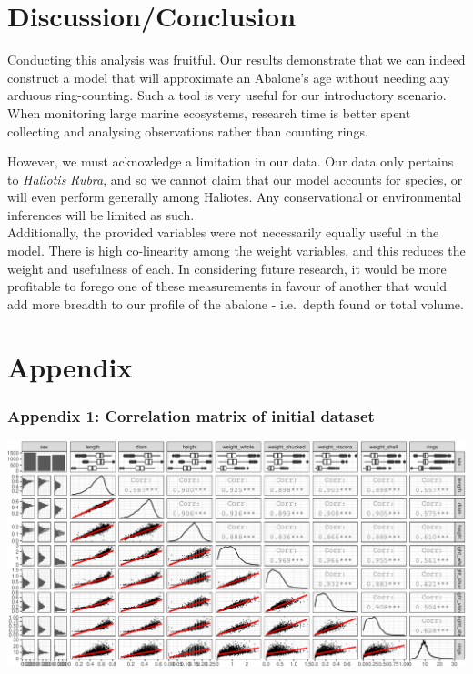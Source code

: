 \documentclass[letterpaper,9pt,twocolumn,twoside,]{pinp}
\begin{document}
\hypertarget{discussionconclusion}{%
\section{Discussion/Conclusion}\label{discussionconclusion}}

Conducting this analysis was fruitful. Our results demonstrate that we
can indeed construct a model that will approximate an Abalone's age
without needing any arduous ring-counting. Such a tool is very useful
for our introductory scenario. When monitoring large marine ecosystems,
research time is better spent collecting and analysing observations
rather than counting rings.

However, we must acknowledge a limitation in our data. Our data only
pertains to \emph{Haliotis} \emph{Rubra}, and so we cannot claim that
our model accounts for species, or will even perform generally among
Haliotes. Any conservational or environmental inferences will be limited
as such.\\
Additionally, the provided variables were not necessarily equally useful
in the model. There is high co-linearity among the weight variables, and
this reduces the weight and usefulness of each. In considering future
research, it would be more profitable to forego one of these
measurements in favour of another that would add more breadth to our
profile of the abalone - i.e.~depth found or total volume.

\hypertarget{appendix}{%
\section{Appendix}\label{appendix}}

\hypertarget{appendix-1-correlation-matrix-of-initial-dataset}{%
\subsubsection{Appendix 1: Correlation matrix of initial
dataset}\label{appendix-1-correlation-matrix-of-initial-dataset}}

\begin{center}\includegraphics{ExecSum_files/figure-latex/unnamed-chunk-9-1} \end{center}
\end{document}
